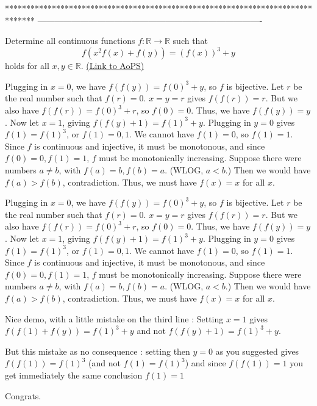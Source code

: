 *******************************************************************************
-------------------------------------------------------------------------------

\begin{problem}
	Determine all continuous functions $f: \mathbb R \to \mathbb R$ such that
\[ f(x^2f(x) + f(y)) = (f(x))^3 + y\]
holds for all $x,y \in \mathbb R$.
	\flushright \href{https://artofproblemsolving.com/community/c6h300783}{(Link to AoPS)}
\end{problem}



\begin{solution}
	Plugging in $ x=0$, we have $ f(f(y))=f(0)^3+y$, so $ f$ is bijective. Let $ r$ be the real number such that $ f(r)=0$. $ x=y=r$ gives $ f(f(r))=r$. But we also have $ f(f(r))=f(0)^3+r$, so $ f(0)=0$. Thus, we have $ f(f(y))=y$.
Now let $ x=1$, giving $ f(f(y)+1)=f(1)^3+y$. Plugging in $ y=0$ gives $ f(1)=f(1)^3$, or $ f(1)=0,1$. We cannot have $ f(1)=0$, so $ f(1)=1$.
Since $ f$ is continuous and injective, it must be monotonous, and since $ f(0)=0, f(1)=1$, $ f$ must be monotonically increasing.
Suppose there were numbers $ a\neq b$, with $ f(a)=b,f(b)=a$. (WLOG, $ a<b$.) Then we would have $ f(a)>f(b)$, contradiction.
Thus, we must have $ f(x)=x$ for all $ x$.
\end{solution}



\begin{solution}
	\begin{tcolorbox}Plugging in $ x = 0$, we have $ f(f(y)) = f(0)^3 + y$, so $ f$ is bijective. Let $ r$ be the real number such that $ f(r) = 0$. $ x = y = r$ gives $ f(f(r)) = r$. But we also have $ f(f(r)) = f(0)^3 + r$, so $ f(0) = 0$. Thus, we have $ f(f(y)) = y$.
Now let $ x = 1$, giving $ f(f(y) + 1) = f(1)^3 + y$. Plugging in $ y = 0$ gives $ f(1) = f(1)^3$, or $ f(1) = 0,1$. We cannot have $ f(1) = 0$, so $ f(1) = 1$.
Since $ f$ is continuous and injective, it must be monotonous, and since $ f(0) = 0, f(1) = 1$, $ f$ must be monotonically increasing.
Suppose there were numbers $ a\neq b$, with $ f(a) = b,f(b) = a$. (WLOG, $ a < b$.) Then we would have $ f(a) > f(b)$, contradiction.
Thus, we must have $ f(x) = x$ for all $ x$.\end{tcolorbox}

Nice demo, with a little mistake on the third line : Setting $ x=1$ gives $ f(f(1)+f(y))=f(1)^3+y$ and not $ f(f(y) + 1) = f(1)^3 + y$. 

But this mistake as no consequence : setting then $ y=0$ as you suggested gives $ f(f(1))=f(1)^3$ (and not $ f(1) = f(1)^3$) and since $ f(f(1))=1$ you get immediately the same conclusion $ f(1)=1$

Congrats.
\end{solution}



